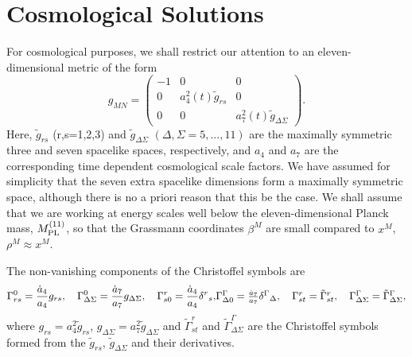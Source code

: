 \documentclass[a4paper,12pt]{article}
\begin{document}
\section{Cosmological Solutions}

For cosmological purposes, we shall restrict our attention to an
eleven-dimensional metric of the form
\begin{equation}
g_{MN}=\left(\begin{array}{ccc}
        -1&0&0\\
        0 & a_4^2(t){\tilde g}_{rs}&0\\
        0 & 0 & a_7^2(t){\tilde {g}}_{\Delta\Sigma}
        \end{array}\right).
\end{equation}
Here, $\tilde{g}_{rs}$ (r,s=1,2,3) and
$\tilde{g}_{\Delta\Sigma}$ $(\Delta,\Sigma=5,...,11)$ are the
maximally symmetric three and seven spacelike spaces,
respectively, and $a_4$ and $a_7$ are the corresponding time
dependent cosmological scale factors. We have assumed for
simplicity that the seven extra spacelike dimensions form a
maximally symmetric space, although there is no a priori reason
that this be the case. We shall assume that we are working at
energy scales well below the eleven-dimensional Planck mass,
$M^{(11)}_{\rm PL}$, so that the Grassmann coordinates $\beta^M$
are small compared to $x^M$, $\rho^M\approx x^M$.

The non-vanishing components of the Christoffel symbols are
\begin{equation}
\Gamma^0_{rs}=\frac{{\dot a}_4}{a_4}g_{rs},\quad
\Gamma^0_{\Delta\Sigma}=\frac{{\dot a}_7}{a_7}g_{\Delta\Sigma},\quad
\Gamma^r_{s0}=\frac{{\dot a}_4}{a_4}{\delta^r}_s,
$$ $$
\Gamma^\Gamma_{\Delta 0}=\frac{{\dot
a}_7}{a_7}{\delta^\Gamma}_\Delta,\quad
\Gamma^r_{st}={\tilde\Gamma}^r_{st},\quad
\Gamma^\Gamma_{\Delta\Sigma}={\tilde\Gamma}^\Gamma_{\Delta\Sigma},
\end{equation}
where $g_{rs}=a^2_4{\tilde g}_{rs}$,
$g_{\Delta\Sigma}=a^2_7{\tilde g}_{\Delta\Sigma}$
and
${\tilde\Gamma}^r_{st}$ and
${\tilde\Gamma}^\Gamma_{\Delta\Sigma}$ are the Christoffel
symbols formed from the ${\tilde g}_{rs}$,
${\tilde g}_{\Delta\Sigma}$ and their derivatives.
\end{document}

